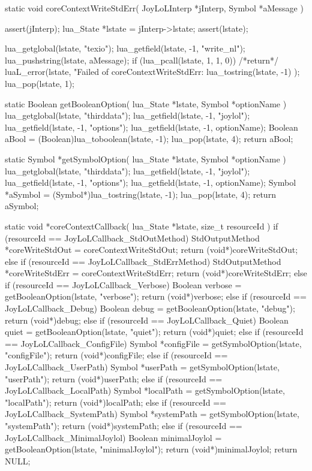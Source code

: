 static void coreContextWriteStdErr(
  JoyLoLInterp *jInterp,
  Symbol       *aMessage
) {
  assert(jInterp);
  lua_State *lstate = jInterp->lstate;
  assert(lstate);
  
  lua_getglobal(lstate, "texio");
  lua_getfield(lstate, -1, "write_nl");
  lua_pushstring(lstate, aMessage);
  if (lua_pcall(lstate, 1, 1, 0)) {
    /*return*/ luaL_error(lstate,
      "Failed of coreContextWriteStdErr\nERROR:\n%
      lua_tostring(lstate, -1)
    );
  }
  lua_pop(lstate, 1);
}

static Boolean getBooleanOption(
  lua_State *lstate, 
  Symbol    *optionName
) {
  lua_getglobal(lstate, "thirddata");
  lua_getfield(lstate, -1, "joylol");
  lua_getfield(lstate, -1, "options");
  lua_getfield(lstate, -1, optionName);
  Boolean aBool = (Boolean)lua_toboolean(lstate, -1);
  lua_pop(lstate, 4);
  return aBool;
}

static Symbol *getSymbolOption(
  lua_State *lstate,
  Symbol    *optionName
) {
  lua_getglobal(lstate, "thirddata");
  lua_getfield(lstate, -1, "joylol");
  lua_getfield(lstate, -1, "options");
  lua_getfield(lstate, -1, optionName);
  Symbol *aSymbol = (Symbol*)lua_tostring(lstate, -1);
  lua_pop(lstate, 4);
  return aSymbol;
}

static void *coreContextCallback(
  lua_State *lstate,
  size_t resourceId
) {
  if (resourceId == JoyLoLCallback_StdOutMethod) {
    StdOutputMethod *coreWriteStdOut =
      coreContextWriteStdOut;
    return (void*)coreWriteStdOut;
  } else if (resourceId == JoyLoLCallback_StdErrMethod) {
    StdOutputMethod *coreWriteStdErr =
      coreContextWriteStdErr;
    return (void*)coreWriteStdErr;
  } else if (resourceId == JoyLoLCallback_Verbose) {
    Boolean verbose = getBooleanOption(lstate, "verbose");
    return (void*)verbose;
  } else if (resourceId == JoyLoLCallback_Debug) {
    Boolean debug = getBooleanOption(lstate, "debug");
    return (void*)debug;
  } else if (resourceId == JoyLoLCallback_Quiet) {
    Boolean quiet = getBooleanOption(lstate, "quiet");
    return (void*)quiet;
  } else if (resourceId == JoyLoLCallback_ConfigFile) {
    Symbol *configFile = getSymbolOption(lstate, "configFile");
    return (void*)configFile;
  } else if (resourceId == JoyLoLCallback_UserPath) {
    Symbol *userPath = getSymbolOption(lstate, "userPath");
    return (void*)userPath;
  } else if (resourceId == JoyLoLCallback_LocalPath) {
    Symbol *localPath = getSymbolOption(lstate, "localPath");
    return (void*)localPath;
  } else if (resourceId == JoyLoLCallback_SystemPath) {
    Symbol *systemPath = getSymbolOption(lstate, "systemPath");
    return (void*)systemPath;
  } else if (resourceId == JoyLoLCallback_MinimalJoylol) {
    Boolean minimalJoylol = getBooleanOption(lstate, "minimalJoylol");
    return (void*)minimalJoylol;
  }
  return NULL;
}
\stopCCode

